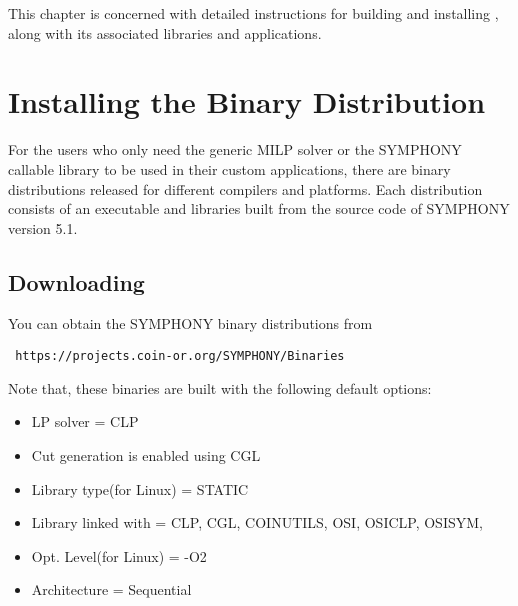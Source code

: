 
This chapter is concerned with detailed instructions for building and
installing \BB, along with its associated libraries and applications.

\section{Installing the Binary Distribution}

For the users who only need the generic MILP solver or the SYMPHONY 
callable library to be used in their custom applications, there are 
binary distributions released for different compilers and platforms. 
Each distribution consists of an executable and libraries built from the 
source code of SYMPHONY version 5.1.
 
\subsection{Downloading}
You can obtain the SYMPHONY binary distributions from 
{\color{Brown}
\begin{verbatim}
 https://projects.coin-or.org/SYMPHONY/Binaries
\end{verbatim}
}

Note that, these binaries are built with the following default options:
\begin{itemize}
\item LP solver = CLP
\item Cut generation is enabled using CGL
\item Library type(for Linux) = STATIC
\item Library linked with = CLP, CGL, COINUTILS, OSI, OSICLP, OSISYM, 
\item Opt. Level(for Linux) = -O2 
\item Architecture = Sequential
\end{itemize} 

